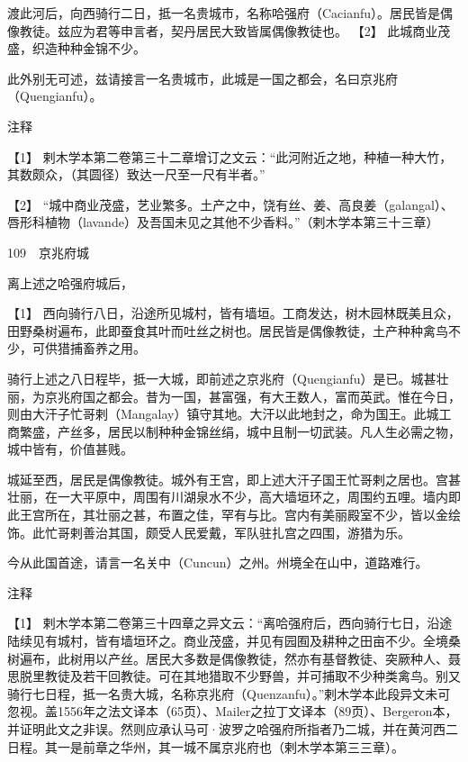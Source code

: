 \documentclass[12pt,UTF8]{ctexbook}
\begin{document}
渡此河后，向西骑行二日，抵一名贵城市，名称哈强府（Cacianfu）。居民皆是偶像教徒。兹应为君等申言者，契丹居民大致皆属偶像教徒也。 【2】 此城商业茂盛，织造种种金锦不少。

此外别无可述，兹请接言一名贵城市，此城是一国之都会，名曰京兆府（Quengianfu）。

注释

【1】 剌木学本第二卷第三十二章增订之文云：“此河附近之地，种植一种大竹，其数颇众，（其圆径）致达一尺至一尺有半者。”

【2】 “城中商业茂盛，艺业繁多。土产之中，饶有丝、姜、高良姜（galangal）、唇形科植物（lavande）及吾国未见之其他不少香料。”（剌木学本第三十三章）





109　京兆府城

离上述之哈强府城后，





【1】 西向骑行八日，沿途所见城村，皆有墙垣。工商发达，树木园林既美且众，田野桑树遍布，此即蚕食其叶而吐丝之树也。居民皆是偶像教徒，土产种种禽鸟不少，可供猎捕畜养之用。

骑行上述之八日程毕，抵一大城，即前述之京兆府（Quengianfu）是已。城甚壮丽，为京兆府国之都会。昔为一国，甚富强，有大王数人，富而英武。惟在今日，则由大汗子忙哥剌（Mangalay）镇守其地。大汗以此地封之，命为国王。此城工商繁盛，产丝多，居民以制种种金锦丝绢，城中且制一切武装。凡人生必需之物，城中皆有，价值甚贱。

城延至西，居民是偶像教徒。城外有王宫，即上述大汗子国王忙哥剌之居也。宫甚壮丽，在一大平原中，周围有川湖泉水不少，高大墙垣环之，周围约五哩。墙内即此王宫所在，其壮丽之甚，布置之佳，罕有与比。宫内有美丽殿室不少，皆以金绘饰。此忙哥剌善治其国，颇受人民爱戴，军队驻扎宫之四围，游猎为乐。

今从此国首途，请言一名关中（Cuncun）之州。州境全在山中，道路难行。

注释

【1】 剌木学本第二卷第三十四章之异文云：“离哈强府后，西向骑行七日，沿途陆续见有城村，皆有墙垣环之。商业茂盛，并见有园囿及耕种之田亩不少。全境桑树遍布，此树用以产丝。居民大多数是偶像教徒，然亦有基督教徒、突厥种人、聂思脱里教徒及若干回教徒。可在其地猎取不少野兽，并可捕取不少种类禽鸟。别又骑行七日程，抵一名贵大城，名称京兆府（Quenzanfu）。”剌木学本此段异文未可忽视。盖1556年之法文译本（65页）、Mailer之拉丁文译本（89页）、Bergeron本，并证明此文之非误。然则应承认马可·波罗之哈强府所指者乃二城，并在黄河西二日程。其一是前章之华州，其一城不属京兆府也（剌木学本第三三章）。
\end{document}
